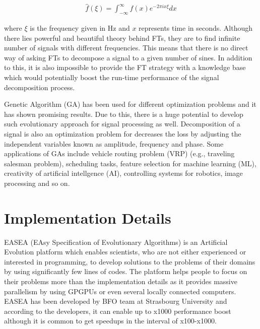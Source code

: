 \documentclass[conference]{IEEEtran}
\begin{document}
\begin{align*}
	\hat{f}(\xi) = \int_{-\infty}^{\infty} f(x) e^{-2\pi ix\xi} dx
\end{align*}

where $\xi$ is the frequency given in Hz and $x$ represents time in seconds. Although there lies powerful and beautiful theory behind FTs, they are to find infinite number of signals with different 
frequencies. This means that there is no direct way of asking FTs to decompose a signal to a given number of sines. In addition to this, it is also impossible to provide the FT strategy with a 
knowledge base which would potentially boost the run-time performance of the signal decomposition process.

Genetic Algorithm (GA) \cite{ga1,ga2,ga3} has been used for different optimization problems and it has shown promising results. Due to this, there is a huge potential to develop such evolutionary 
approach for signal processing as well. Decomposition of a signal is also an optimization problem for decreases the loss by adjusting the independent variables known as amplitude, frequency and phase. 
Some applications of GAs include vehicle routing problem (VRP) (e.g., traveling salesman problem), scheduling tasks, feature selection for machine learning (ML), creativity of artificial intellgence (AI), 
controlling systems for robotics, image processing and so on.

\section{Implementation Details}
EASEA (EAsy Specification of Evolutionary Algorithms) \cite{easea} is an Artificial Evolution platform which enables scientists, who are not either experienced or interested in programming, to develop 
solutions to the problems of their domains by using significantly few lines of codes. The platform helps people to focus on their problems more than the implementation details as it provides massive 
parallelism by using GPGPUs or even several locally connected computers. EASEA has been developed by BFO team at Strasbourg University and according to the developers, it can enable up to x1000 performance 
boost although it is common to get speedups in the interval of x100-x1000.
\end{document}
